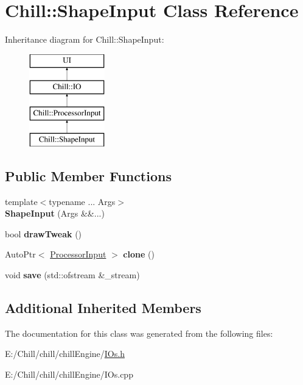 \hypertarget{class_chill_1_1_shape_input}{}\section{Chill\+:\+:Shape\+Input Class Reference}
\label{class_chill_1_1_shape_input}
Inheritance diagram for Chill\+:\+:Shape\+Input\+:\begin{figure}[H]
\begin{center}
\leavevmode
\includegraphics[height=4.000000cm]{class_chill_1_1_shape_input}
\end{center}
\end{figure}
\subsection*{Public Member Functions}
\begin{DoxyCompactItemize}
\item 
\mbox{\label{class_chill_1_1_shape_input_a5a99471e5c5f3abca0e6964f60ca07f9}} 
{\footnotesize template$<$typename ... Args$>$ }\\{\bfseries Shape\+Input} (Args \&\&...)
\item 
\mbox{\label{class_chill_1_1_shape_input_a27f594f200e3754d3961a08a3d91c598}} 
bool {\bfseries draw\+Tweak} ()
\item 
\mbox{\label{class_chill_1_1_shape_input_a7f419d09fc694bdbae28dfa7293f1f46}} 
Auto\+Ptr$<$ \mbox{\hyperlink{class_chill_1_1_processor_input}{Processor\+Input}} $>$ {\bfseries clone} ()
\item 
\mbox{\label{class_chill_1_1_shape_input_ad5a032d3cc8f3c5674eda4369a2c3c47}} 
void {\bfseries save} (std\+::ofstream \&\+\_\+stream)
\end{DoxyCompactItemize}
\subsection*{Additional Inherited Members}


The documentation for this class was generated from the following files\+:\begin{DoxyCompactItemize}
\item 
E\+:/\+Chill/chill/chill\+Engine/\mbox{\hyperlink{_i_os_8h}{I\+Os.\+h}}\item 
E\+:/\+Chill/chill/chill\+Engine/I\+Os.\+cpp\end{DoxyCompactItemize}
